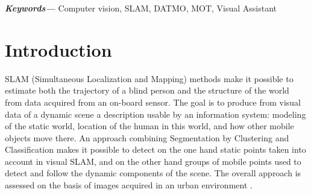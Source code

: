 \documentclass[conference,compsoc]{IEEEtran}
\providecommand{\keywords}[1]
{
  \small	
  \textbf{\textit{Keywords---}} #1
}
\begin{document}
\keywords{Computer vision, SLAM, DATMO, MOT, Visual Assistant}



%
\IEEEpeerreviewmaketitle



\section{Introduction}
SLAM (Simultaneous Localization and Mapping) \cite{mozos2007interest} methods make it possible to estimate both the trajectory of a blind person and the structure of the world from data acquired from an on-board sensor. The goal is to produce from visual data of a dynamic scene a description usable by an information system: modeling of the static world, location of the human in this world, and how other mobile objects move there. An approach combining Segmentation by Clustering and Classification makes it possible to detect on the one hand static points taken into account in visual SLAM, and on the other hand groups of mobile points used to detect and follow the dynamic components of the scene. The overall approach is assessed on the basis of images acquired in an urban environment \cite{gil2010comparative}.
\end{document}
